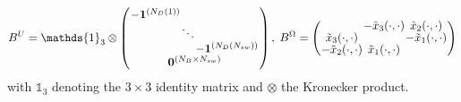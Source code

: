 \begin{equation*}
\arraycolsep=0.4pt\def\arraystretch{0.8}
    B^U = \mathds{1}_{3} \otimes \left(\begin{array}{c}
         \begin{array}{ccc}
             -\bm{1}^{(N_D(1))} & & \\
              & \ddots & \\
              & & -\bm{1}^{(N_D(N_{sw}))}
         \end{array}\\
         \bm{0}^{(N_B \times N_{sw})}
    \end{array}\right), \;
    B^\Omega =
    \left(\begin{array}{ccc}
             & -\tilde{x}_3(\cdot,\cdot) & \tilde{x}_2(\cdot,\cdot)\\
            \tilde{x}_3(\cdot,\cdot) & & -\tilde{x}_1(\cdot,\cdot)\\
            -\tilde{x}_2(\cdot,\cdot) & \tilde{x}_1(\cdot,\cdot) &
          \end{array}\right)
\end{equation*}
with $\mathds{1}_{3}$ denoting the $3\times3$ identity matrix and $\otimes$ the Kronecker product.

